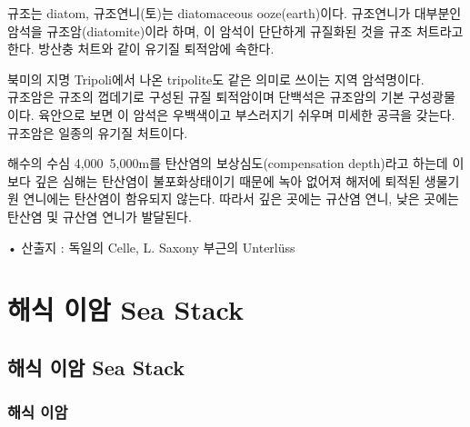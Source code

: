 \documentclass[12pt, a4paper, twoside]{book}
\begin{document}
				규조는 diatom, 규조연니(토)는 diatomaceous ooze(earth)이다. 
				규조연니가 대부분인 암석을 규조암(diatomite)이라 하며, 이 암석이 단단하게 규질화된 것을 규조 처트라고 한다. 
				방산충 처트와 같이 유기질 퇴적암에 속한다. 
				
				북미의 지명 Tripoli에서 나온 tripolite도 같은 의미로 쓰이는 지역 암석명이다.  \\
				
				규조암은 규조의 껍데기로 구성된 규질 퇴적암이며 단백석은 규조암의 기본 구성광물이다. 
				육안으로 보면 이 암석은 우백색이고 부스러지기 쉬우며 미세한 공극을 갖는다. 
				규조암은 일종의 유기질 처트이다.

				해수의 수심 4,000~5,000m를 탄산염의 보상심도(compensation depth)라고 하는데 이보다 깊은 심해는 탄산염이 불포화상태이기 때문에 녹아 없어져 해저에 퇴적된 생물기원 연니에는 탄산염이 함유되지 않는다. 
				따라서 깊은 곳에는 규산염 연니, 낮은 곳에는 탄산염 및 규산염 연니가 발달된다.

			• 산출지 : 독일의 Celle, L. Saxony 부근의 Unterlüss













	\newpage
	\chapter{해식 이암 Sea Stack}


		\minitoc				%





	\clearpage
	\section{해식 이암 Sea Stack}



	\subsection{해식 이암}
	
\end{document}
